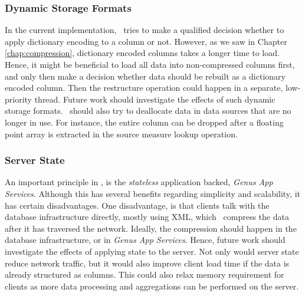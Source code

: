 \subsubsection{Dynamic Storage Formats}
\label{ssub:Dynamic Storage Formats}
In the current implementation, \gap~tries to make a qualified decision whether to apply dictionary encoding to a column or not. However, as we saw in Chapter \ref{chap:compression}, dictionary encoded columns takes a longer time to load. Hence, it might be beneficial to load all data into non-compressed columns first, and only then make a decision whether data should be rebuilt as a dictionary encoded column. Then the restructure operation could happen in a separate, low-priority thread. Future work should investigate the effects of such dynamic storage formats. \gap~should also try to deallocate data in data sources that are no longer in use. For instance, the entire column can be dropped after a floating point array is extracted in the source measure lookup operation.

\subsubsection{Server State}
\label{ssub:Server State}
An important principle in \gap, is the \textit{stateless} application backed, \textit{Genus App Services}. Although this has several benefits regarding simplicity and scalability, it has certain disadvantages. One disadvantage, is that clients talk with the database infrastructure directly, mostly using XML, which \gap~compress the data after it has traversed the network. Ideally, the compression should happen in the database infrastructure, or in \textit{Genus App Services}. Hence, future work should investigate the effects of applying state to the server. Not only would server state reduce network traffic, but it would also improve client load time if the data is already structured as columns. This could also relax memory requirement for clients as more data processing and aggregations can be performed on the server.

